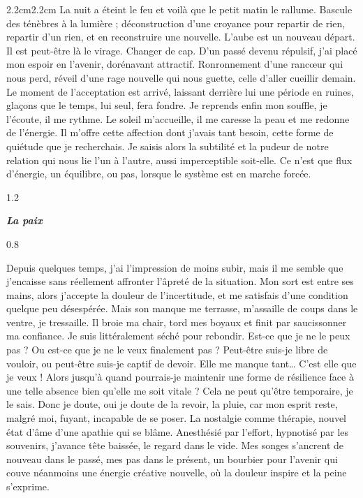 \begin{adjustwidth}{2.2cm}{2.2cm}
La nuit a éteint le feu et voilà que le petit matin le rallume. Bascule des ténèbres à la lumière ; déconstruction d’une croyance pour repartir de rien, repartir d’un rien, et en reconstruire une nouvelle. L’aube est un nouveau départ. Il est peut-être là le virage. Changer de cap. D’un passé devenu répulsif, j’ai placé mon espoir en l’avenir, dorénavant attractif. Ronronnement d’une rancœur qui nous perd, réveil d’une rage nouvelle qui nous guette, celle d’aller cueillir demain. Le moment de l’acceptation est arrivé, laissant derrière lui une période en ruines, glaçons que le temps, lui seul, fera fondre. Je reprends enfin mon souffle, je l’écoute, il me rythme. Le soleil m’accueille, il me caresse la peau et me redonne de l’énergie. Il m’offre cette affection dont j’avais tant besoin, cette forme de quiétude que je recherchais. Je saisis alors la subtilité et la pudeur de notre relation qui nous lie l’un à l’autre, aussi imperceptible soit-elle. Ce n’est que flux d’énergie, un équilibre, ou pas, lorsque le système est en marche forcée.
\begin{spacing}{1.2}
~
\end{spacing}
\begin{center}
\textbf{\textit{La paix}}
\end{center}
\begin{spacing}{0.8}
~
\end{spacing}
Depuis quelques temps, j’ai l’impression de moins subir, mais il me semble que j’encaisse sans réellement affronter l’âpreté de la situation. Mon sort est entre ses mains, alors j’accepte la douleur de l’incertitude, et me satisfais d’une condition quelque peu désespérée. Mais son manque me terrasse, m’assaille de coups dans le ventre, je tressaille. Il broie ma chair, tord mes boyaux et finit par saucissonner ma confiance. Je suis littéralement séché pour rebondir. Est-ce que je ne le peux pas ? Ou est-ce que je ne le veux finalement pas ? Peut-être suis-je libre de vouloir, ou peut-être suis-je captif de devoir. Elle me manque tant… C’est elle que je veux ! Alors jusqu’à quand pourrais-je maintenir une forme de résilience face à une telle absence bien qu’elle me soit vitale ? Cela ne peut qu’être temporaire, je le sais. Donc je doute, oui je doute de la revoir, la pluie, car mon esprit reste, malgré moi, fuyant, incapable de se poser. La nostalgie comme thérapie, nouvel état d’âme d’une apathie qui se blâme. Anesthésié par l’effort, hypnotisé par les souvenirs, j’avance tête baissée, le regard dans le vide. Mes songes s’ancrent de nouveau dans le passé, mes pas dans le présent, un bourbier pour l’avenir qui couve néanmoins une énergie créative nouvelle, où la douleur inspire et la peine s’exprime.


\end{adjustwidth}

